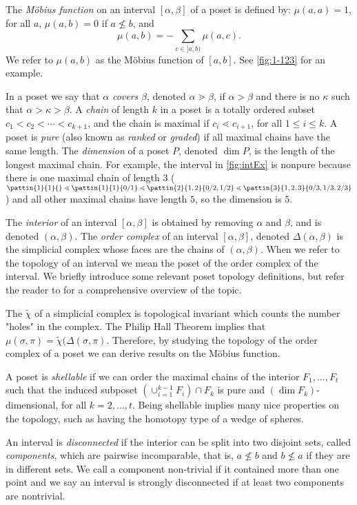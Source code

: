 \documentclass[11pt,a4paper,oneside]{article}
\begin{document}
The \emph{M\"obius function} on an interval $[\alpha,\beta]$ of a poset is defined by:
$\mu(a,a)=1$, for all $a$, $\mu(a,b)=0$ if $a\not\le b$, and $$\mu(a,b)=-\sum_{c\in[a,b)}\mu(a,c).$$
We refer to $\mu(a,b)$ as the M\"obius function of $[a,b]$. See \cref{fig:1-123} for an example.

In a poset we say that $\alpha$ \emph{covers} $\beta$, denoted $\alpha\gtrdot\beta$, if $\alpha>\beta$
and there is no $\kappa$ such that $\alpha>\kappa>\beta$. A \emph{chain} of length $k$ in a poset is 
a totally ordered subset $c_1<c_2<\cdots<c_{k+1}$, and the chain is maximal if $c_i\lessdot c_{i+1}$,
for all $1\le i \le k$. A poset is \emph{pure} (also known as \emph{ranked} or \emph{graded}) if all
maximal chains have the same length. The \emph{dimension} of a poset $P$, denoted $\dim P$, is the 
length of the longest maximal chain. For example, the interval in \cref{fig:intEx} is nonpure because
there is one maximal chain of length $3$ ($\pattin{1}{1}{}\lessdot\pattin{1}{1}{0/1}\lessdot
\pattin{2}{1,2}{0/2,1/2}\lessdot\pattin{3}{1,2,3}{0/3,1/3,2/3}$) and all other maximal chains have 
length $5$, so the dimension is $5$.

The \emph{interior} of an interval $[\alpha,\beta]$ is obtained by removing $\alpha$ and $\beta$, 
and is denoted $(\alpha,\beta)$. The \emph{order complex} of an interval $[\alpha,\beta]$, denoted 
$\Delta(\alpha,\beta)$ is the simplicial complex whose faces are the chains of $(\alpha,\beta)$. 
When we refer to the topology of an interval we mean the poset of the order complex of the interval. 
We briefly introduce some relevant poset topology definitions, but refer the reader to \cite{Wac07} 
for a comprehensive overview of the topic.

The  $\tilde{\chi}$ of a simplicial complex is topological invariant 
which counts the number "holes" in the complex. The Philip Hall Theorem implies that 
$\mu(\sigma,\pi)=\tilde{\chi}(\Delta(\sigma,\pi)$. Therefore, by studying the topology of the order 
complex of a poset we can derive results on the M\"obius function.

A poset is \emph{shellable} if we can order the maximal chains of the interior $F_1,\ldots,F_t$ 
such that the induced subposet $\left(\cup_{i=1}^{k-1}F_i\right)\cap F_k$ is pure and 
$(\dim F_k)$-dimensional, for all $k=2,\ldots,t$. Being shellable implies many nice properties 
on the topology, such as having the homotopy type of a wedge of spheres.

An interval is \emph{disconnected} if the interior can be split into two disjoint sets, called 
\emph{components}, which are pairwise incomparable, that is, $a\not\le b$ and $b\not\le a$ if 
they are in different sets. We call a component non-trivial if it contained more than one point 
and we say an interval is strongly disconnected if at least two components are nontrivial.
\end{document}
